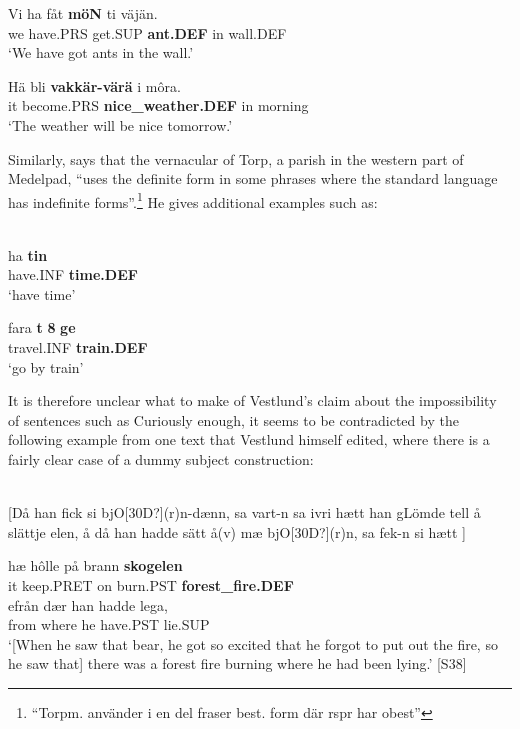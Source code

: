 \z

\ea
\gll Vi  ha  fåt  \textbf{möN} ti  väjän.  \\
we  have.PRS  get.SUP  \textbf{ant.DEF} in  wall.DEF  \\
\glt ‘We have got ants in the wall.’

\z

\ea
\gll Hä  bli  \textbf{vakkär-värä} i  môra.\\
it  become.PRS  \textbf{nice\_weather.DEF} in  morning\\
\glt ‘The weather will be nice tomorrow.’

\z

Similarly, \citet[140]{Bogren1921} says that the vernacular of Torp, a parish in the western part of Medelpad, “uses the definite form in some phrases where the standard language has indefinite forms”.\footnote{ “Torpm. använder i en del fraser best. form där rspr har obest”} He gives additional examples such as:

\ea\label{}
\\
\gll ha  \textbf{tin} \\
have.INF  \textbf{time.DEF} \\
\glt ‘have time’

\z

\ea
\gll fara  \textbf{t} \textbf{8} \textbf{ge}\\
travel.INF  \textbf{train.DEF}\\
\glt ‘go by train’

\z

It is therefore unclear what to make of Vestlund’s claim about the impossibility of sentences such as Curiously enough, it seems to be contradicted by the following example from one text that Vestlund himself edited, where there is a fairly clear case of a dummy subject construction:



\ea\label{}
\\
{}[Då han fick si bjO[30D?](r)n{}-dænn, sa vart-n sa ivri hætt han gLömde tell å slättje elen, å då han hadde sätt å(v) mæ bjO[30D?](r)n, sa fek-n si hætt ]

\gll 	hæ  hôlle  på  brann  \textbf{skogelen}\\
		it  keep.PRET  on  burn.PST  \textbf{forest\_fire.DEF}\\
\gll 	efrån  dær  han  hadde  lega,\\
		from  where  he   have.PST  lie.SUP\\
\glt  	‘[When he saw that bear, he got so excited that he forgot to put out the fire, so he saw that] there was a forest fire burning where he had been lying.’ [S38]

